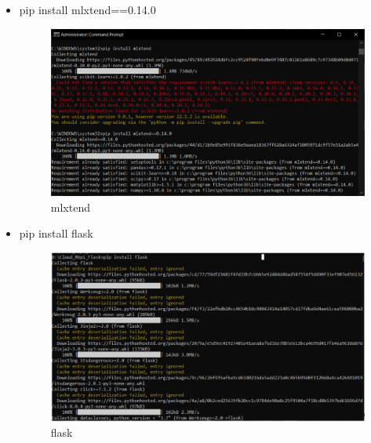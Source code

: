 \documentclass[10pt]{article}
\begin{document}
\begin{itemize}
\item pip install mlxtend==0.14.0
\begin{figure}[H]
    \begin{center}
        \includegraphics[width=0.7\linewidth, frame]{CA2-template/CM26.png}
       \caption{mlxtend \label{fig:17}}
    \end{center}
\end{figure}

\item pip install flask
\begin{figure}[H]
    \begin{center}
        \includegraphics[width=0.7\linewidth, frame]{CA2-template/CM28.png}
       \caption{flask \label{fig:18}}
    \end{center}
\end{figure}
\end{itemize}
\end{document}

